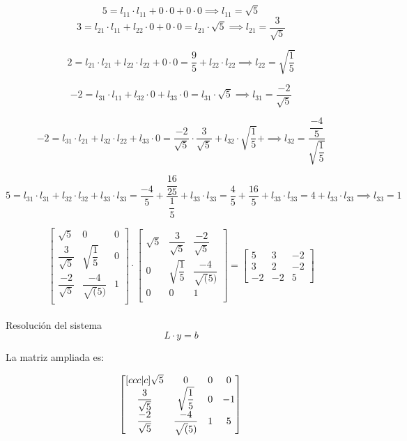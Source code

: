 \documentclass{article}
\begin{document}
\[
5 = l_{11} \cdot l_{11} + 0 \cdot 0 + 0 \cdot 0 \implies l_{11} = \sqrt{5}
\]
\[
3 = l_{21} \cdot l_{11} + l_{22} \cdot 0 + 0 \cdot 0 
  = l_{21} \cdot \sqrt{5} 
\implies l_{21} = \dfrac{3}{\sqrt{5}}
\]

\[
2 = l_{21} \cdot l_{21} + l_{22} \cdot l_{22} + 0 \cdot 0 
  = \dfrac{9}{5} + l_{22} \cdot l_{22} 
\implies l_{22} = \sqrt{\dfrac{1}{5}}
\]

\[
-2 = l_{31} \cdot l_{11} + l_{32} \cdot 0 + l_{33} \cdot 0 
= l_{31} \cdot \sqrt{5} 
\implies l_{31} = \dfrac{-2}{\sqrt{5}}
\]

\[
-2 = l_{31} \cdot l_{21} + l_{32} \cdot l_{22} + l_{33} \cdot 0 
= \dfrac{-2}{\sqrt{5}} \cdot \dfrac{3}{\sqrt{5}} + l_{32} \cdot \sqrt{\dfrac{1}{5}} +
\implies l_{32} = \dfrac{\dfrac{-4}{5}}{\sqrt{\dfrac{1}{5}}}
\]

\[
5 = l_{31} \cdot l_{31} + l_{32} \cdot l_{32} + l_{33} \cdot l_{33}
= \dfrac{-4}{5} + \dfrac{\dfrac{16}{25}}{\dfrac{1}{5}} + l_{33} \cdot l_{33}
= \dfrac{4}{5} + \dfrac{16}{5} + l_{33} \cdot l_{33}
= 4 + l_{33} \cdot l_{33}
\implies l_{33} = 1
\]

\[
\begin{bmatrix}
\sqrt{5} & 0 & 0 \\
\dfrac{3}{\sqrt{5}} & \sqrt{\dfrac{1}{5}} & 0 \\
\dfrac{-2}{\sqrt{5}} & \dfrac{-4}{\sqrt(5)} & 1 \\
\end{bmatrix} 
\cdot
\begin{bmatrix}
\sqrt{5} & \dfrac{3}{\sqrt{5}} & \dfrac{-2}{\sqrt{5}} \\
0 & \sqrt{\dfrac{1}{5}} & \dfrac{-4}{\sqrt(5)} \\
0 & 0 & 1 \\
\end{bmatrix} 
=
\begin{bmatrix}
5 & 3 & -2 \\
3 & 2 & -2 \\
-2 & -2 & 5 
\end{bmatrix} 
\]\\

Resolución del sistema
\[
L \cdot y = b
\]

La matriz ampliada es:

\[ 
\begin{bmatrix}[ccc|c]
  \sqrt{5} & 0 & 0 & 0\\ 
\dfrac{3}{\sqrt{5}} & \sqrt{\dfrac{1}{5}} & 0 & -1\\
\dfrac{-2}{\sqrt{5}} & \dfrac{-4}{\sqrt(5)} & 1 & 5 \\
\end{bmatrix}\\
\]\\
\end{document}
